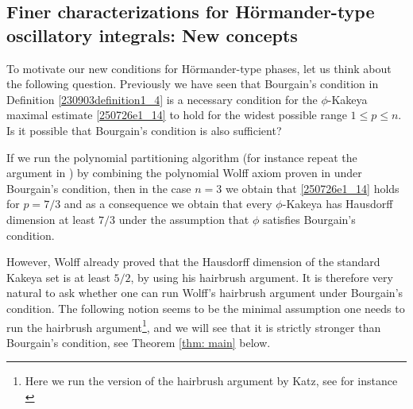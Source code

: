 \documentclass{article}
\numberwithin{equation}{section}
\theoremstyle{plain}
\begin{document}
\subsection{Finer characterizations for H\"ormander-type oscillatory integrals: New concepts}\label{250726subsection1_2}




To motivate our new conditions for H\"ormander-type phases, let us think about the following question. Previously we have seen that Bourgain's condition in Definition \ref{230903definition1_4} is a necessary condition for the $\phi$-Kakeya maximal estimate \eqref{250726e1_14} to hold for the widest possible range $1\le p\le n$. Is it possible that Bourgain's condition is also sufficient? 



If we run the polynomial partitioning algorithm (for instance repeat the argument in \cite{HRZ22}) by combining the polynomial Wolff axiom proven in \cite{GWZ24} under Bourgain's condition, then in the case $n=3$ we obtain that \eqref{250726e1_14} holds for $p=7/3$ and as a consequence we obtain that every $\phi$-Kakeya has Hausdorff dimension at least $7/3$ under the assumption that $\phi$ satisfies Bourgain's condition. 


However, Wolff \cite{Wol95} already proved that the Hausdorff dimension of the standard Kakeya set is at least $5/2$, by using his hairbrush argument. It is therefore very natural to ask whether one can run Wolff's hairbrush argument under Bourgain's condition. The following notion seems to be the minimal assumption one needs to run the hairbrush argument\footnote{Here we run the version of the hairbrush argument by Katz, see for instance \cite{Wis03}}, and we will see that it is strictly stronger than Bourgain's condition, see Theorem \ref{thm: main} below. 
\end{document}
